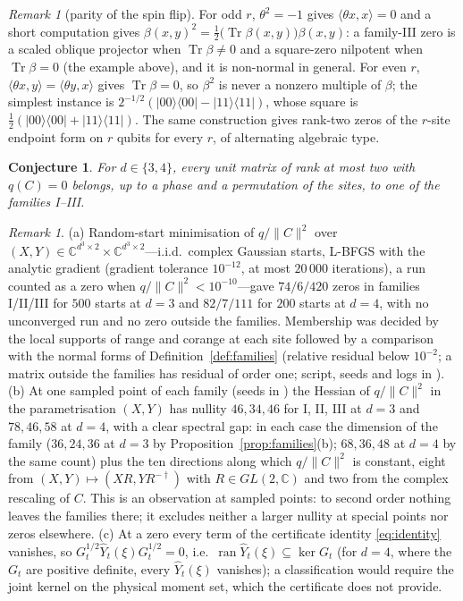 \documentclass[aps,pra,twocolumn,superscriptaddress,nofootinbib,longbibliography]{revtex4-2}
\newcommand{\C}{\mathbb C}
\newcommand{\ip}[2]{\langle #1,#2\rangle}
\newcommand{\ket}[1]{|#1\rangle}
\newcommand{\bra}[1]{\langle #1|}
\DeclareMathOperator{\Tr}{Tr}
\DeclareMathOperator{\ran}{ran}
\newcommand{\Yh}{\widehat Y}
\theoremstyle{plain}
\newtheorem{conjecture}[theorem]{Conjecture}
\theoremstyle{definition}
\theoremstyle{remark}
\newtheorem{remark}[theorem]{Remark}
\begin{document}
\begin{remark}[parity of the spin flip]\label{rem:parity}
For odd $r$, $\theta^2=-1$ gives $\ip{\theta x}{x}=0$ and a short computation gives $\beta(x,y)^2=\tfrac12\bigl(\Tr\beta(x,y)\bigr)\beta(x,y)$: a family-III zero is a scaled oblique projector when $\Tr\beta\ne0$ and a square-zero nilpotent when $\Tr\beta=0$ (the example above), and it is non-normal in general. For even $r$, $\ip{\theta x}{y}=\ip{\theta y}{x}$ gives $\Tr\beta=0$, so $\beta^2$ is never a nonzero multiple of $\beta$; the simplest instance is $2^{-1/2}(\ket{00}\bra{00}-\ket{11}\bra{11})$, whose square is $\tfrac12(\ket{00}\bra{00}+\ket{11}\bra{11})$. The same construction gives rank-two zeros of the $r$-site endpoint form on $r$ qubits for every $r$, of alternating algebraic type.
\end{remark}

\begin{conjecture}\label{conj:zeros}
For $d\in\{3,4\}$, every unit matrix of rank at most two with $q(C)=0$ belongs, up to a phase and a permutation of the sites, to one of the families \mbox{I--III}.
\end{conjecture}

\begin{remark}\label{rem:evidence}
(a) Random-start minimisation of $q/\|C\|^2$ over $(X,Y)\in\C^{d^3\times2}\times\C^{d^3\times2}$---i.i.d.\ complex Gaussian starts, L-BFGS with the analytic gradient (gradient tolerance $10^{-12}$, at most $20\,000$ iterations), a run counted as a zero when $q/\|C\|^2<10^{-10}$---gave $74/6/420$ zeros in families I/II/III for $500$ starts at $d=3$ and $82/7/111$ for $200$ starts at $d=4$, with no unconverged run and no zero outside the families. Membership was decided by the local supports of range and corange at each site followed by a comparison with the normal forms of Definition~\ref{def:families} (relative residual below $10^{-2}$; a matrix outside the families has residual of order one; script, seeds and logs in \cite{Pkg}).
(b) At one sampled point of each family (seeds in \cite{Pkg}) the Hessian of $q/\|C\|^2$ in the parametrisation $(X,Y)$ has nullity $46,34,46$ for I, II, III at $d=3$ and $78,46,58$ at $d=4$, with a clear spectral gap: in each case the dimension of the family ($36,24,36$ at $d=3$ by Proposition~\ref{prop:families}(b); $68,36,48$ at $d=4$ by the same count) plus the ten directions along which $q/\|C\|^2$ is constant, eight from $(X,Y)\mapsto(XR,YR^{-\dagger})$ with $R\in GL(2,\C)$ and two from the complex rescaling of $C$. This is an observation at sampled points: to second order nothing leaves the families there; it excludes neither a larger nullity at special points nor zeros elsewhere.
(c) At a zero every term of the certificate identity \eqref{eq:identity} vanishes, so $G_t^{1/2}\Yh_t(\xi)G_t^{1/2}=0$, i.e.\ $\ran\Yh_t(\xi)\subseteq\ker G_t$ (for $d=4$, where the $G_t$ are positive definite, every $\Yh_t(\xi)$ vanishes); a classification would require the joint kernel on the physical moment set, which the certificate does not provide.
\end{remark}
\end{document}
